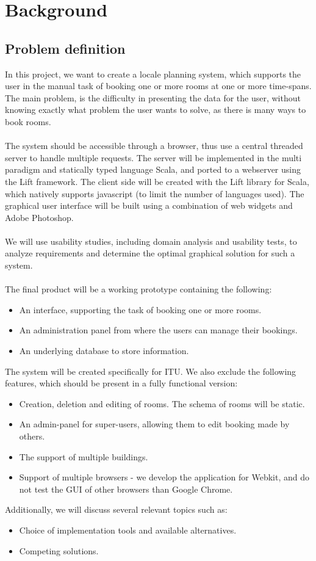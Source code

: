 \chapter{Background}
\section{Problem definition}
In this project, we want to create a locale planning system, which supports the user in the manual task of booking one or more rooms at one or more time-spans. The main problem, is the difficulty in presenting the data for the user, without knowing exactly what problem the user wants to solve, as there is many ways to book rooms. \\
\\
The system should be accessible through a browser, thus use a central threaded server to handle multiple requests. The server will be implemented in the multi paradigm and statically typed language Scala, and ported to a webserver using the Lift framework. The client side will be created with the Lift library for Scala, which natively supports javascript (to limit the number of languages used). The graphical user interface will be built using a combination of web widgets and Adobe Photoshop. \\
\\
We will use usability studies, including domain analysis and usability tests, to analyze requirements and determine the optimal graphical solution for such a system. \\
\\
The final product will be a working prototype containing the following: 
\begin{itemize}
\item An interface, supporting the task of booking one or more rooms.
\item An administration panel from where the users can manage their bookings. 
\item An underlying database to store information.
\end{itemize}


\noindent The system will be created specifically for ITU. We also exclude the following features, which should be present in a fully functional version: 
\begin{itemize}
\item Creation, deletion and editing of rooms. The schema of rooms will be static. 
\item An admin-panel for super-users, allowing them to edit booking made by others. 
\item The support of multiple buildings. 
\item Support of multiple browsers - we develop the application for Webkit, and do not test the GUI of other browsers than Google Chrome. 
\end{itemize}
Additionally, we will discuss several relevant topics such as: 
\begin{itemize}
\item Choice of implementation tools and available alternatives. 
\item Competing solutions. 
\end{itemize}

